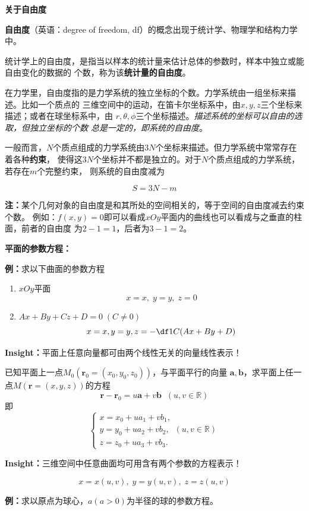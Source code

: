\begin{shaded}
	{\bf 关于自由度}
	
	{\bf 自由度}（英语：degree of freedom, df）的概念出现于统计学、物理学和结构力学中。

	统计学上的自由度，是指当以样本的统计量来估计总体的参数时，样本中独立或能自由变化的数据的
	个数，称为该{\bf 统计量的自由度}。

	在力学里，自由度指的是力学系统的独立坐标的个数。力学系统由一组坐标来描述。比如一个质点的
	三维空间中的运动，在笛卡尔坐标系中，由$x, y, z$三个坐标来描述；或者在球坐标系中，由
	$r,\theta,\phi$三个坐标描述。{\it 描述系统的坐标可以自由的选取，但独立坐标的个数
	总是一定的，即系统的自由度}。

	一般而言，$N$个质点组成的力学系统由$3N$个坐标来描述。但力学系统中常常存在着各种{\bf 约束}，
	使得这$3N$个坐标并不都是独立的。对于$N$个质点组成的力学系统，若存在$m$个完整约束，
	则系统的自由度减为

	$$S=3N-m$$
\end{shaded}

{\bf 注：}某个几何对象的自由度是和其所处的空间相关的，等于空间的自由度减去约束个数。
例如：$f(x,y)=0$即可以看成$xOy$平面内的曲线也可以看成与之垂直的柱面，前者的自由度
为$2-1=1$，后者为$3-1=2$。

{\bf 平面的参数方程：}

{\bf 例：}求以下曲面的参数方程
\begin{enumerate}[(1)]
  \setlength{\itemindent}{1cm}
  \item $xOy$平面 
  $${x=x,\;y=y,\;z=0}$$ 
  \item $Ax+By+Cz+D=0\;(C\ne 0)$ 
  $${x=x,y=y,z=-\df 1C(Ax+By+D)}$$
\end{enumerate}

{\bf Insight：}平面上任意向量都可由两个线性无关的向量线性表示！

已知平面上一点$M_0(\bm{r}_0=(x_0,y_0,z_0))$，与平面平行的向量
$\bm{a},\bm{b}$，求平面上任一点$M(\bm{r}=(x,y,z))$的方程 
$${\bm{r}-\bm{r}_0=u\bm{a}+v\bm{b}\;\;(u,v\in\mathbb{R})}$$ 
即
$${\left\{\begin{array}{l}
	x=x_0+ua_1+vb_1,\\
	y=y_0+ua_2+vb_2,\;\;(u,v\in\mathbb{R})\\
	z=z_0+ua_3+vb_3.
\end{array}\right.}$$

{\bf Insight：}三维空间中任意曲面均可用含有两个参数的方程表示！

$${x=x(u,v),\;y=y(u,v),\;z=z(u,v)}$$

{\bf 例：}求以原点为球心，$a(a>0)$为半径的球的参数方程。

